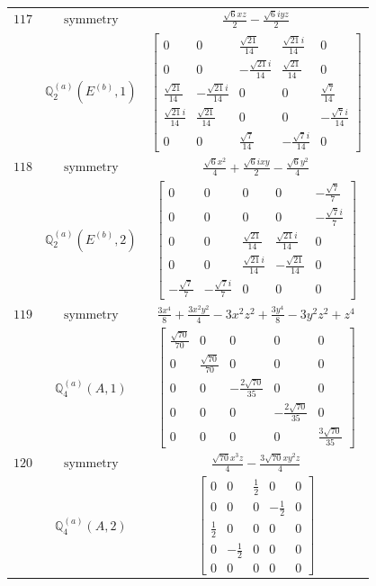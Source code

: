 \documentclass[fleqn,8pt,landscape]{jsarticle}
\begin{document}
\begin{longtable}{ccc}
$ 117 $ & $ \text{symmetry} $ & $ \frac{\sqrt{6} x z}{2} - \frac{\sqrt{6} i y z}{2} $ \\
$  $ & $ \mathbb{Q}_{2}^{(a)}(E^{(b)},1) $ & $ \begin{bmatrix} 0 & 0 & \frac{\sqrt{21}}{14} & \frac{\sqrt{21} i}{14} & 0 \\ 0 & 0 & - \frac{\sqrt{21} i}{14} & \frac{\sqrt{21}}{14} & 0 \\ \frac{\sqrt{21}}{14} & - \frac{\sqrt{21} i}{14} & 0 & 0 & \frac{\sqrt{7}}{14} \\ \frac{\sqrt{21} i}{14} & \frac{\sqrt{21}}{14} & 0 & 0 & - \frac{\sqrt{7} i}{14} \\ 0 & 0 & \frac{\sqrt{7}}{14} & - \frac{\sqrt{7} i}{14} & 0 \end{bmatrix} $ \\ \hline
$ 118 $ & $ \text{symmetry} $ & $ \frac{\sqrt{6} x^{2}}{4} + \frac{\sqrt{6} i x y}{2} - \frac{\sqrt{6} y^{2}}{4} $ \\
$  $ & $ \mathbb{Q}_{2}^{(a)}(E^{(b)},2) $ & $ \begin{bmatrix} 0 & 0 & 0 & 0 & - \frac{\sqrt{7}}{7} \\ 0 & 0 & 0 & 0 & - \frac{\sqrt{7} i}{7} \\ 0 & 0 & \frac{\sqrt{21}}{14} & \frac{\sqrt{21} i}{14} & 0 \\ 0 & 0 & \frac{\sqrt{21} i}{14} & - \frac{\sqrt{21}}{14} & 0 \\ - \frac{\sqrt{7}}{7} & - \frac{\sqrt{7} i}{7} & 0 & 0 & 0 \end{bmatrix} $ \\ \hline
$ 119 $ & $ \text{symmetry} $ & $ \frac{3 x^{4}}{8} + \frac{3 x^{2} y^{2}}{4} - 3 x^{2} z^{2} + \frac{3 y^{4}}{8} - 3 y^{2} z^{2} + z^{4} $ \\
$  $ & $ \mathbb{Q}_{4}^{(a)}(A,1) $ & $ \begin{bmatrix} \frac{\sqrt{70}}{70} & 0 & 0 & 0 & 0 \\ 0 & \frac{\sqrt{70}}{70} & 0 & 0 & 0 \\ 0 & 0 & - \frac{2 \sqrt{70}}{35} & 0 & 0 \\ 0 & 0 & 0 & - \frac{2 \sqrt{70}}{35} & 0 \\ 0 & 0 & 0 & 0 & \frac{3 \sqrt{70}}{35} \end{bmatrix} $ \\ \hline
$ 120 $ & $ \text{symmetry} $ & $ \frac{\sqrt{70} x^{3} z}{4} - \frac{3 \sqrt{70} x y^{2} z}{4} $ \\
$  $ & $ \mathbb{Q}_{4}^{(a)}(A,2) $ & $ \begin{bmatrix} 0 & 0 & \frac{1}{2} & 0 & 0 \\ 0 & 0 & 0 & - \frac{1}{2} & 0 \\ \frac{1}{2} & 0 & 0 & 0 & 0 \\ 0 & - \frac{1}{2} & 0 & 0 & 0 \\ 0 & 0 & 0 & 0 & 0 \end{bmatrix} $ \\ \hline

\end{longtable}
\end{document}
